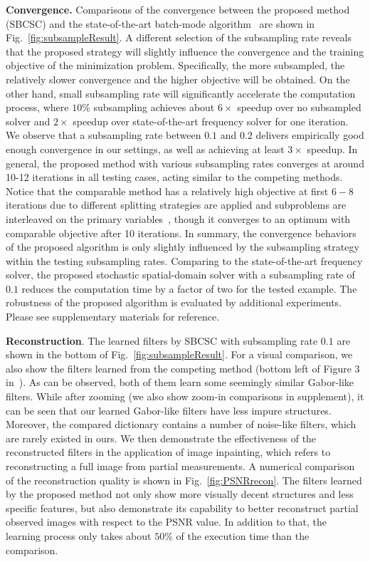 {\bfseries Convergence.} Comparisons of the convergence between the proposed method (SBCSC) and the state-of-the-art batch-mode algorithm~\cite{heide2015fast} are shown in Fig.\ \ref{fig:subsampleResult}. A different selection of the subsampling rate reveals that the proposed strategy will slightly influence the convergence and the training objective of the minimization problem. Specifically, the more subsampled, the relatively slower convergence and the higher objective will be obtained. On the other hand, small subsampling rate will significantly accelerate the computation process, where $10\%$ subsampling achieves about $6 \times$ speedup over no subsampled solver and $2 \times$ speedup over state-of-the-art frequency solver for one iteration. We observe that a subsampling rate between $0.1$ and $0.2$ delivers empirically good enough convergence in our settings, as well as achieving at least $3 \times$ speedup. In general, the proposed method with various subsampling rates converges at around 10-12 iterations in all testing cases, acting similar to the competing methods. Notice that the comparable method has a relatively high objective at first $6-8$ iterations due to different splitting strategies are applied and subproblems are interleaved on the primary variables~\cite{wohlberg2016efficient}, though it converges to an optimum with comparable objective after 10 iterations. In summary, the convergence behaviors of the proposed algorithm is only slightly influenced by the subsampling strategy within the testing subsampling rates. Comparing to the state-of-the-art frequency solver, the proposed stochastic spatial-domain solver with a subsampling rate of $0.1$ reduces the computation time by a factor of two for the tested example. The robustness of the proposed algorithm is evaluated by additional experiments. Please see supplementary materials for reference.

{\bfseries Reconstruction}. The learned filters by SBCSC with subsampling rate $0.1$ are shown in the bottom of Fig.\ \ref{fig:subsampleResult}. For a visual comparison, we also show the filters learned from the competing method (bottom left of Figure 3 in~\cite{heide2015fast}). As can be observed, both of them learn some seemingly similar Gabor-like filters. While after zooming (we also show zoom-in comparisons in supplement), it can be seen that our learned Gabor-like filters have less impure structures. Moreover, the compared dictionary contains a number of noise-like filters, which are rarely existed in ours. We then demonstrate the effectiveness of the reconstructed filters in the application of image inpainting, which refers to reconstructing a full image from partial measurements. A numerical comparison of the reconstruction quality is shown in Fig.\ \ref{fig:PSNRrecon}. The filters learned by the proposed method not only show more visually decent structures and less specific features, but also demonstrate its capability to better reconstruct partial observed images with respect to the PSNR value. In addition to that, the learning process only takes about $50\%$ of the execution time than the comparison.

